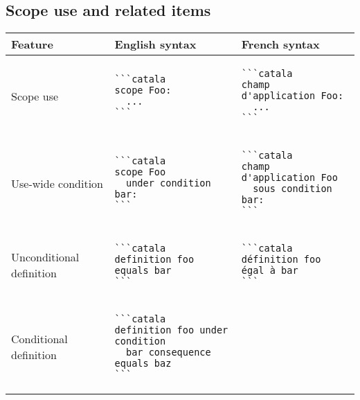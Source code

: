 \documentclass[a3paper,landscape]{article}
\begin{document}
\begin{multicols*}{2}
\section*{Scope use and related items}
\begin{center}
\begin{tabular}{p{}p{}p{}}
\toprule
Feature&English syntax&French syntax\\\midrule
Scope use&
\vspace*{-1.7em}
\begin{verbatim}
```catala
scope Foo:
  ...
```
\end{verbatim}
\vspace*{-1.7em}
&
\vspace*{-1.7em}
\begin{verbatim}
```catala
champ d'application Foo:
  ...
```
\end{verbatim}
\vspace*{-1.7em}
\\
Use-wide condition&
\vspace*{-1.7em}
\begin{verbatim}
```catala
scope Foo
  under condition bar:
```
\end{verbatim}
\vspace*{-1.7em}
&
\vspace*{-1.7em}
\begin{verbatim}
```catala
champ d'application Foo
  sous condition bar:
```
\end{verbatim}
\vspace*{-1.7em}
\\
Unconditional definition&
\vspace*{-1.7em}
\begin{verbatim}
```catala
definition foo equals bar
```
\end{verbatim}
\vspace*{-1.7em}
&
\vspace*{-1.7em}
\begin{verbatim}
```catala
définition foo égal à bar
```
\end{verbatim}
\vspace*{-1.7em}
\\
Conditional definition&
\vspace*{-1.7em}
\begin{verbatim}
```catala
definition foo under condition
  bar consequence equals baz
```
\end{verbatim}
\vspace*{-1.7em}

\end{tabular}
\end{center}
\end{multicols*}
\end{document}

